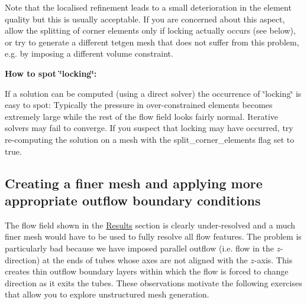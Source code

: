 Note that the localised refinement leads to a small deterioration in the element quality but this is usually acceptable. If you are concerned about this aspect, allow the splitting of corner elements only if locking actually occurs (see below), or try to generate a different {\ttfamily tetgen} mesh that does not suffer from this problem, e.\+g. by imposing a different volume constraint.

\begin{center} {\bfseries How to spot \char`\"{}locking\char`\"{}\+:} \end{center} 
\begin{DoxyItemize}
\item If a solution can be computed (using a direct solver) the occurrence of \char`\"{}locking\char`\"{} is easy to spot\+: Typically the pressure in over-\/constrained elements becomes extremely large while the rest of the flow field looks fairly normal. Iterative solvers may fail to converge. If you suspect that locking may have occurred, try re-\/computing the solution on a mesh with the {\ttfamily split\+\_\+corner\+\_\+elements} flag set to {\ttfamily true}.
\end{DoxyItemize}

\hypertarget{index_finer_mesh}{}\subsection{Creating a finer mesh and applying more appropriate outflow boundary conditions}\label{index_finer_mesh}
The flow field shown in the \hyperlink{index_results}{Results} section is clearly under-\/resolved and a much finer mesh would have to be used to fully resolve all flow features. The problem is particularly bad because we have imposed parallel outflow (i.\+e. flow in the $ z $-\/direction) at the ends of tubes whose axes are not aligned with the $ z $-\/axis. This creates thin outflow boundary layers within which the flow is forced to change direction as it exits the tubes. These observations motivate the following exercises that allow you to explore unstructured mesh generation.


